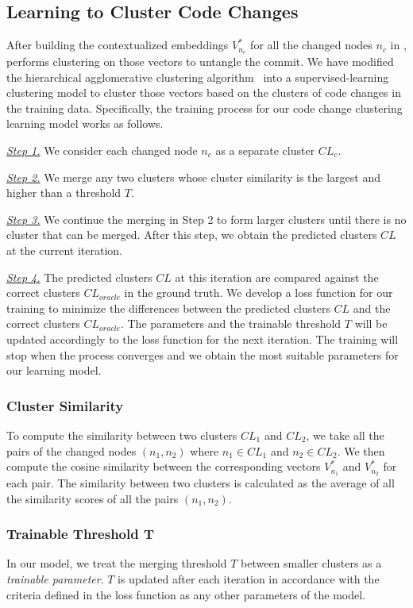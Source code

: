 \subsection{Learning to Cluster Code Changes}
\label{clustering:sec}

After building the contextualized embeddings $V^{*}_{n_c}$ for all the
changed nodes $n_c$ in {\mvpdg}, {\tool} performs clustering on those
vectors to untangle the commit. We have modified the hierarchical
agglomerative clustering algorithm~\cite{clustering} into a
supervised-learning clustering model to cluster those vectors based on
the clusters of code changes in the training data. Specifically, the
training process for our code change clustering learning model works as
follows.

{\em \underline{Step 1.}} We consider each changed node $n_c$ as
a separate cluster $CL_c$.

{\em \underline{Step 2.}} We merge any two clusters whose cluster
similarity is the largest and higher than a threshold $T$.

{\em \underline{Step 3.}} We continue the merging in Step 2 to form
larger clusters until there is no cluster that can be merged. After
this step, we obtain the predicted clusters $CL$ at the current
iteration.

{\em \underline{Step 4.}} The predicted clusters $CL$ at this iteration
are compared against the correct clusters $CL_{oracle}$ in the ground
truth. We develop a loss function for our training to minimize the
differences between the predicted clusters $CL$ and the correct
clusters $CL_{oracle}$. The parameters and the trainable threshold $T$
will be updated accordingly to the loss function for the next
iteration. The training will stop when the process converges and we
obtain the most suitable parameters for our learning model.

\subsubsection*{{\bf Cluster Similarity}}
To compute the similarity between two clusters $CL_1$ and $CL_2$, we
take all the pairs of the changed nodes $(n_1,n_2)$ where $n_1 \in
CL_1$ and $n_2 \in CL_2$. We then compute the cosine similarity
between the corresponding vectors $V^{*}_{n_1}$ and $V^{*}_{n_2}$ for
each pair. The similarity between two clusters is calculated as the
average of all the similarity scores of all the pairs $(n_1,n_2)$.

\subsubsection*{{\bf Trainable Threshold T}}
In our
model, we treat the merging threshold $T$ between smaller clusters as
a {\em trainable parameter}. $T$ is updated after each iteration in
accordance with the criteria defined in the loss function as any other
parameters of the model.

